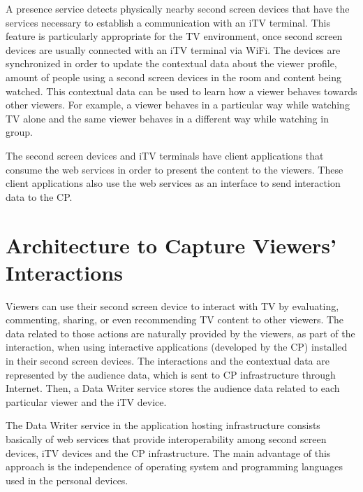 \documentclass[journal]{IEEEtran}
\begin{document}
A presence service detects physically nearby second screen devices that have the services necessary to establish a communication with an iTV terminal. This feature is particularly appropriate for the TV environment, once second screen devices are usually connected with an iTV terminal via WiFi. The devices are synchronized in order to update the contextual data about the viewer profile, amount of people using a second screen devices in the room and content being watched. This contextual data can be used to learn how a viewer behaves towards other viewers. For example, a viewer behaves in a particular way while watching TV alone and the same viewer behaves in a different way while watching in group.

The second screen devices and iTV terminals have client applications that consume the web services in order to present the content to the viewers. These client applications also use the web services as an interface to send interaction data to the CP. 




\section{Architecture to Capture Viewers' Interactions}
\label{sec_architecture}

Viewers can use their second screen device to interact with TV by evaluating, commenting, sharing, or even recommending TV content to other viewers. The data related to those actions are naturally provided by the viewers, as part of the interaction, when using interactive applications (developed by the CP) installed in their second screen devices. The interactions and the contextual data are represented by the audience data, which is sent to CP infrastructure through Internet. Then, a Data Writer service stores the audience data related to each particular viewer and the iTV device.

The Data Writer service in the application hosting infrastructure consists basically of web services that provide interoperability among second screen devices, iTV devices and the CP infrastructure. The main advantage of this approach is the independence of operating system and programming languages used in the personal devices.
 
\end{document}
